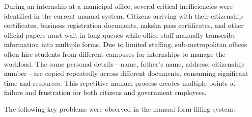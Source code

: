 \documentclass[12pt]{report}
\begin{document}
During an internship at a municipal office, several critical inefficiencies were 
identified in the current manual system. Citizens arriving with their citizenship 
certificates, business registration documents, naksha pass certificates, and other 
official papers must wait in long queues while office staff manually transcribe 
information into multiple forms. Due to limited staffing, sub-metropolitan offices 
often hire students from different campuses for internships to manage the workload. 
The same personal details—name, father's name, address, citizenship number—are 
copied repeatedly across different documents, consuming significant time and 
resources. This repetitive manual process creates multiple points of failure and 
frustration for both citizens and government employees.

The following key problems were observed in the manual form-filling system:
\end{document}
